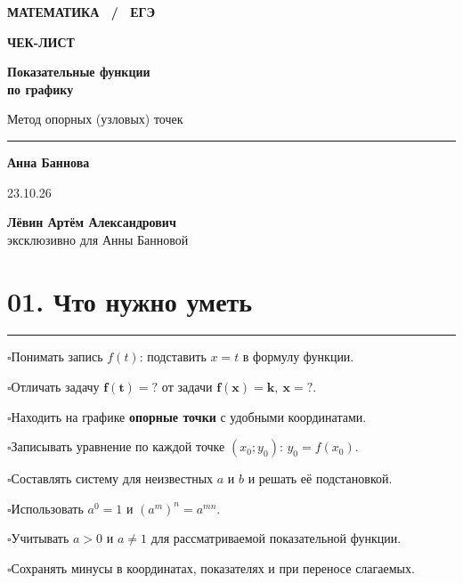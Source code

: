 \documentclass[a4paper,12pt]{article}
\newcommand{\checkitem}{\(\square\)\enspace}
\newcommand{\strong}[1]{\textcolor{darkaccent}{\textbf{#1}}}
\newcommand{\sectionline}{\par\vspace{-3pt}\noindent\textcolor{accent}{\rule{\linewidth}{0.5pt}}\par\vspace{2pt}}
\begin{document}
\thispagestyle{empty}
\begin{center}
\vspace*{22mm}
{\large\textcolor{accent}{\textbf{МАТЕМАТИКА \ / \ ЕГЭ}}}\par\vspace{20mm}
{\fontsize{31}{35}\selectfont\bfseries ЧЕК-ЛИСТ}\par\vspace{10mm}
{\fontsize{21}{28}\selectfont\bfseries Показательные функции\\ по графику}\par\vspace{9mm}
{\large Метод опорных (узловых) точек}\par
\vspace{16mm}
\textcolor{accent}{\rule{0.58\linewidth}{0.7pt}}\par\vspace{15mm}
{\large\bfseries Анна Баннова}\par\vspace{4mm}
23.10.26\par\vspace{10mm}
\normalsize\textcolor{textgray}{\textbf{Лёвин Артём Александрович}\\[2mm] эксклюзивно для Анны Банновой}
\end{center}
\vfill
\begin{center}
\end{center}
\clearpage

\section*{01. Что нужно уметь}
\sectionline
\checkitem Понимать запись $f(t)$: подставить $x=t$ в формулу функции.\par
\checkitem Отличать задачу \(\boldsymbol{f(t)=?}\) от задачи \(\boldsymbol{f(x)=k,\ x=?}\).\par
\checkitem Находить на графике \strong{опорные точки} с удобными координатами.\par
\checkitem Записывать уравнение по каждой точке $(x_0;y_0)$: \(y_0=f(x_0)\).\par
\checkitem Составлять систему для неизвестных $a$ и $b$ и решать её подстановкой.\par
\checkitem Использовать \(a^0=1\) и \((a^m)^n=a^{mn}\).\par
\checkitem Учитывать \(a>0\) и \(a\ne1\) для рассматриваемой показательной функции.\par
\checkitem Сохранять минусы в координатах, показателях и при переносе слагаемых.\par
\end{document}
